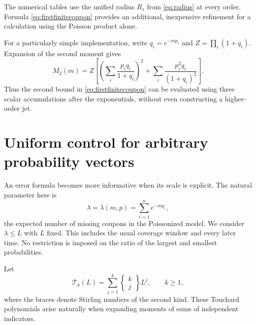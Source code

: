 \documentclass[11pt,a4paper]{article}
\theoremstyle{definition}
\begin{document}
The numerical tables use the unified radius $R_s$ from
\eqref{eq:radius} at every order. Formula \eqref{eq:firstfinitecoupon}
provides an additional, inexpensive refinement for a calculation using
the Poisson product alone.

For a particularly simple implementation, write $q_i=e^{-mp_i}$ and
$Z=\prod_i(1+q_i)$. Expansion of the second moment gives
\begin{equation}\label{eq:closedM2}
 M_2(m)=Z\left[
   \left(\sum_i\frac{p_iq_i}{1+q_i}\right)^2
   +\sum_i\frac{p_i^2q_i}{(1+q_i)^2}\right].
\end{equation}
Thus the second bound in \eqref{eq:firstfinitecoupon} can be evaluated
using three scalar accumulations after the exponentials, without even
constructing a higher-order jet.

\section{Uniform control for arbitrary probability vectors}\label{sec:uniform}

An error formula becomes more informative when its scale is explicit. The
natural parameter here is
\begin{equation}\label{eq:lambda}
 \lambda=\lambda(m,p)=\sum_{i=1}^n e^{-mp_i},
\end{equation}
the expected number of missing coupons in the Poissonized model.
We consider $\lambda\le L$ with $L$ fixed. This includes the usual
coverage window and every later time. No restriction is imposed on the
ratio of the largest and smallest probabilities.

Let
\begin{equation}\label{eq:touchard}
 \mathcal T_k(L)=\sum_{j=1}^k
       \left\{\begin{matrix}k\\j\end{matrix}\right\}L^j,\qquad k\ge1,
\end{equation}
where the braces denote Stirling numbers of the second kind. These
Touchard polynomials arise naturally when expanding moments of sums
of independent indicators.
\end{document}
